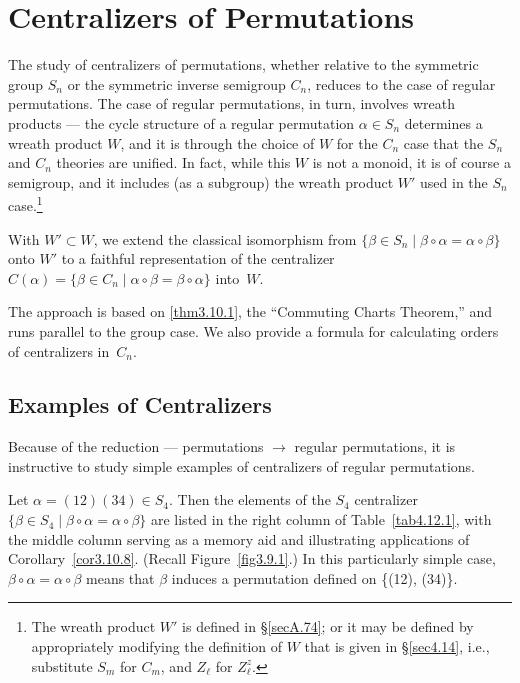 \documentclass{surv-l}
\numberwithin{equation}{section}
\numberwithin{table}{section}
\numberwithin{figure}{section}
\theoremstyle{definition}
\begin{document}
\chapter{Centralizers of Permutations}\label{chap4}

The study of centralizers of permutations, whether relative to the
symmetric group $S_{n}$ or the symmetric inverse semigroup
$C_{n}$, reduces to the case of regular permutations. The case of
regular permutations, in turn, involves wreath products --- the
cycle structure of a regular permutation $\alpha\in S_{n}$
determines a wreath product $W$, and it is
through the choice of $W$ for the $C_{n}$ case that the $S_{n}$
and $C_{n}$ theories are unified. In fact, while this $W$ is not a
monoid, it is of course a semigroup, and it includes (as a
subgroup) the wreath product $W'$ used in the $S_{n}$
case.\footnote{The wreath product $W'$ is defined in
\S\ref{secA.74}; or it may be defined by appropriately modifying
the definition of $W$ that is given in \S\ref{sec4.14}, i.e.,
substitute $S_{m}$ for $C_{m}$, and $Z_{\ell}$ for
$Z_{\ell}^{z}$.}

With $W'\subset W$, we extend the classical isomorphism from
$\{\beta\in S_{n}\mid \beta \circ\alpha= \alpha \circ\beta\}$
onto $W'$ to a faithful representation of the centralizer
$C(\alpha)=\{\beta\in C_{n}\mid \alpha \circ\beta=\beta
\circ\alpha\}$ into~$W$.

The approach is based on \ref{thm3.10.1}, the ``Commuting Charts
Theorem,'' and runs parallel to the group case. We also provide a
formula for calculating orders of
centralizers in~$C_{n}$.

\setcounter{section}{11}
\section{Examples of Centralizers}\label{sec4.12}

Because of the reduction --- permutations $\rightarrow$ regular
permutations, it is instructive to study simple examples of
centralizers of regular permutations.

Let $\alpha=(12)(34)\in S_{4}$. Then the elements of the $S_{4}$
centralizer $\{\beta\in S_{4}\mid \beta \circ\alpha=\alpha
\circ\beta\}$ are listed in the right column of
Table~\ref{tab4.12.1}, with the middle column serving as a memory
aid and illustrating applications of Corollary~\ref{cor3.10.8}.
(Recall Figure~\ref{fig3.9.1}.) In this particularly simple case,
$\beta \circ\alpha=\alpha \circ\beta$ means that $\beta$ induces a
permutation defined on \{(12), (34)\}.
\end{document}
